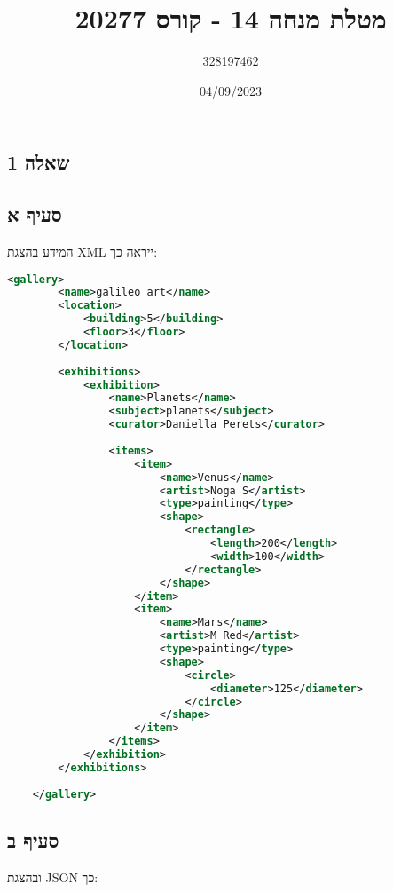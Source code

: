 \documentclass{article}
\title{מטלת מנחה 14 - קורס 20277}
\author{328197462}
\date{04/09/2023}
\begin{document}
\begin{hebrew}
    \maketitle
    \section*{שאלה 1}

    \subsection*{סעיף א}
    המידע בהצגת XML ייראה כך:
\end{hebrew}

\begin{lstlisting}[language=XML]
        <gallery>
        <name>galileo art</name>
        <location>
            <building>5</building>
            <floor>3</floor>
        </location>
    
        <exhibitions>
            <exhibition>
                <name>Planets</name>
                <subject>planets</subject>
                <curator>Daniella Perets</curator>
    
                <items>
                    <item>
                        <name>Venus</name>
                        <artist>Noga S</artist>
                        <type>painting</type>
                        <shape>
                            <rectangle>
                                <length>200</length>
                                <width>100</width>
                            </rectangle>
                        </shape>
                    </item>
                    <item>
                        <name>Mars</name>
                        <artist>M Red</artist>
                        <type>painting</type>
                        <shape>
                            <circle>
                                <diameter>125</diameter>
                            </circle>
                        </shape>
                    </item>
                </items>
            </exhibition>
        </exhibitions>
    
    </gallery>
\end{lstlisting}

\pagebreak

\begin{hebrew}
    \subsection*{סעיף ב}
    ובהצגת JSON כך:
\end{hebrew}
\end{document}
